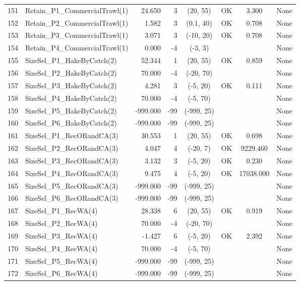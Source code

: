 \documentclass[12pt,]{article}
\begin{document}
\begin{landscape}
\begin{longtable}{rlrrcccl}
  151 & Retain\_P1\_CommercialTrawl(1) & 24.650 & 3 & (20, 55) & OK & 3.300 & None \\ 
  152 & Retain\_P2\_CommercialTrawl(1) & 1.582 & 3 & (0.1, 40) & OK & 0.708 & None \\ 
  153 & Retain\_P3\_CommercialTrawl(1) & 3.071 & 3 & (-10, 20) & OK & 0.708 & None \\ 
  154 & Retain\_P4\_CommercialTrawl(1) & 0.000 & -4 & (-3, 3) &  &  & None \\ 
  155 & SizeSel\_P1\_HakeByCatch(2) & 52.344 & 1 & (20, 55) & OK & 0.859 & None \\ 
  156 & SizeSel\_P2\_HakeByCatch(2) & 70.000 & -4 & (-20, 70) &  &  & None \\ 
  157 & SizeSel\_P3\_HakeByCatch(2) & 4.281 & 3 & (-5, 20) & OK & 0.111 & None \\ 
  158 & SizeSel\_P4\_HakeByCatch(2) & 70.000 & -4 & (-5, 70) &  &  & None \\ 
  159 & SizeSel\_P5\_HakeByCatch(2) & -999.000 & -99 & (-999, 25) &  &  & None \\ 
  160 & SizeSel\_P6\_HakeByCatch(2) & -999.000 & -99 & (-999, 25) &  &  & None \\ 
  161 & SizeSel\_P1\_RecORandCA(3) & 30.553 & 1 & (20, 55) & OK & 0.698 & None \\ 
  162 & SizeSel\_P2\_RecORandCA(3) & 4.047 & 4 & (-20, 7) & OK & 9229.460 & None \\ 
  163 & SizeSel\_P3\_RecORandCA(3) & 3.132 & 3 & (-5, 20) & OK & 0.230 & None \\ 
  164 & SizeSel\_P4\_RecORandCA(3) & 9.475 & 4 & (-5, 20) & OK & 17038.000 & None \\ 
  165 & SizeSel\_P5\_RecORandCA(3) & -999.000 & -99 & (-999, 25) &  &  & None \\ 
  166 & SizeSel\_P6\_RecORandCA(3) & -999.000 & -99 & (-999, 25) &  &  & None \\ 
  167 & SizeSel\_P1\_RecWA(4) & 28.338 & 6 & (20, 55) & OK & 0.919 & None \\ 
  168 & SizeSel\_P2\_RecWA(4) & 70.000 & -4 & (-20, 70) &  &  & None \\ 
  169 & SizeSel\_P3\_RecWA(4) & -1.427 & 6 & (-5, 20) & OK & 2.392 & None \\ 
  170 & SizeSel\_P4\_RecWA(4) & 70.000 & -4 & (-5, 70) &  &  & None \\ 
  171 & SizeSel\_P5\_RecWA(4) & -999.000 & -99 & (-999, 25) &  &  & None \\ 
  172 & SizeSel\_P6\_RecWA(4) & -999.000 & -99 & (-999, 25) &  &  & None \\ 

\end{longtable}
\end{landscape}
\end{document}
